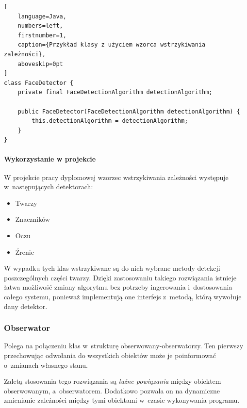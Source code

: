 \vspace{5mm}

\begin{addmargin}[10mm]{0mm}
\begin{lstlisting}[
    language=Java,
    numbers=left,
    firstnumber=1,
    caption={Przykład klasy z użyciem wzorca wstrzykiwania zależności},
    aboveskip=0pt
]
class FaceDetector {
    private final FaceDetectionAlgorithm detectionAlgorithm;
    
    public FaceDetector(FaceDetectionAlgorithm detectionAlgorithm) {
        this.detectionAlgorithm = detectionAlgorithm;
    }
}
\end{lstlisting}
\end{addmargin}


\vspace{5mm}


\paragraph{Wykorzystanie w projekcie}

W projekcie pracy dyplomowej wzorzec wstrzykiwania zależności występuje w~następujących detektorach:

\begin{itemize}
    \item Twarzy
    \item Znaczników
    \item Oczu
    \item Źrenic
\end{itemize}
    
W wypadku tych klas wstrzykiwane są do nich wybrane metody detekcji poszczególnych części twarzy. Dzięki zastosowaniu takiego rozwiązania istnieje łatwa możliwość zmiany algorytmu bez potrzeby ingerowania i~dostosowania całego systemu, ponieważ implementują one interfejs z~metodą, którą wywołuje dany detektor. 
    
    
    
\subsubsection{Obserwator}

Polega na połączeniu klas w~strukturę obserwowany-obserwatorzy. Ten pierwszy przechowując odwołania do wszystkich obiektów może je poinformować o~zmianach własnego stanu.

\par

Zaletą stosowania tego rozwiązania są \textit{luźne powiązania} między obiektem obserwowanym, a~obserwatorem. Dodatkowo pozwala on na dynamiczne zmienianie zależności między tymi obiektami w~czasie wykonywania programu. 


